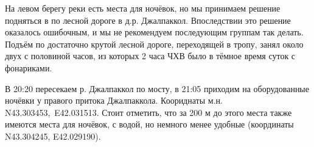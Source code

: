 На левом берегу реки есть места для ночёвок, но мы принимаем решение подняться в по лесной дороге в д.р. Джалпаккол. Впоследствии это решение оказалось ошибочным, и мы не рекомендуем последующим группам так делать. Подъём по достаточно крутой лесной дороге, переходящей в тропу, занял около двух с половиной часов, из которых 2 часа ЧХВ было в тёмное время суток с фонариками.

В 20:20 пересекаем р. Джалпаккол по мосту, в 21:05 приходим на оборудованные ночёвки у правого притока Джалпаккола. Коориднаты м.н. N43.303453\degree,~E42.031513\degree. Стоит отметить, что за 200 м до этого места также имеются места для ночёвок, с водой, но немного менее удобные (координаты N43.304245\degree, E42.029190\degree).



\clearpage